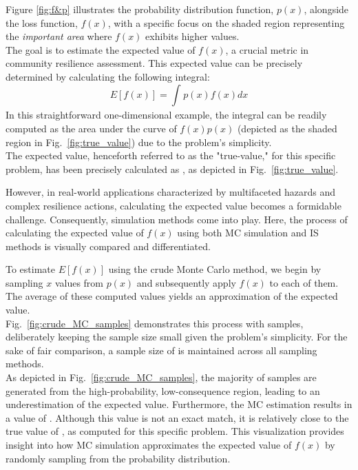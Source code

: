     

    Figure \ref{fig:f&p} illustrates the probability distribution function, $p(x)$, alongside the loss function, $f(x)$, with a specific focus on the shaded region representing the \textit{important area} where $f(x)$ exhibits higher values. \\
    The goal is to estimate the expected value of $f(x)$, a crucial metric in community resilience assessment. This expected value can be precisely determined by calculating the following integral:
    $$E[f(x)]=\int_{}^{}p(x)f(x)dx$$
    In this straightforward one-dimensional example, the integral can be readily computed as the area under the curve of $f(x)p(x)$ (depicted as the shaded region in Fig.~\ref{fig:true_value}) due to the problem's simplicity. \\
    The expected value, henceforth referred to as the "true-value," for this specific problem, has been precisely calculated as \TrueValue, as depicted in Fig.~\ref{fig:true_value}.
    
    

    However, in real-world applications characterized by multifaceted hazards and complex resilience actions, calculating the expected value becomes a formidable challenge. Consequently, simulation methods come into play. Here, the process of calculating the expected value of $f(x)$ using both MC simulation and IS methods is visually compared and differentiated.
    
    To estimate $E[f(x)]$ using the crude Monte Carlo method, we begin by sampling $x$ values from $p(x)$ and subsequently apply $f(x)$ to each of them. The average of these computed values yields an approximation of the expected value.\\ Fig.~\ref{fig:crude_MC_samples} demonstrates this process with \SampleSize{} samples, deliberately keeping the sample size small given the problem's simplicity. For the sake of fair comparison, a sample size of \SampleSize{} is maintained across all sampling methods.\\

    

    As depicted in Fig.~\ref{fig:crude_MC_samples}, the majority of samples are generated from the high-probability, low-consequence region, leading to an underestimation of the expected value. Furthermore, the MC estimation results in a value of \MCResult. Although this value is not an exact match, it is relatively close to the true value of \TrueValue, as computed for this specific problem. This visualization provides insight into how MC simulation approximates the expected value of $f(x)$ by randomly sampling from the probability distribution.
    
